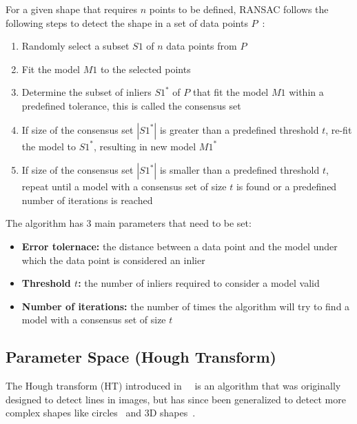 For a given shape that requires $n$ points to be defined, RANSAC follows the following steps to detect the shape
in a set of data points $P$~\parencite{fischler_random_1981}:
\begin{enumerate}
    \item Randomly select a subset $S1$ of $n$ data points from $P$
    \item Fit the model $M1$ to the selected points
    \item Determine the subset of inliers $S1^*$ of $P$ that fit the model $M1$ within a predefined tolerance, this is called the consensus set
    \item If size of the consensus set $|S1^*|$ is greater than a predefined threshold $t$, re-fit the model to $S1^*$, resulting in new model $M1^*$
    \item If size of the consensus set $|S1^*|$ is smaller than a predefined threshold $t$, repeat until a model with a consensus set of size $t$ is found or a predefined number of iterations is reached
\end{enumerate}

The algorithm has 3 main parameters that need to be set:
\begin{itemize}
    \item \textbf{Error tolernace:} the distance between a data point and the model under which the data point is considered an inlier
    \item \textbf{Threshold $t$:} the number of inliers required to consider a model valid
    \item \textbf{Number of iterations:} the number of times the algorithm will try to find a model with a consensus set of size $t$
\end{itemize}

\subsection{Parameter Space (Hough Transform)}
The Hough transform (HT) introduced in~\citeyear{hough_method_1962}~\parencite{hough_method_1962}
is an algorithm that was originally designed to detect lines in images,
but has since been generalized to detect more complex shapes like circles~\cite{ballard_generalizing_1981} and 3D shapes~\cite{woodford_demisting_2014}.

